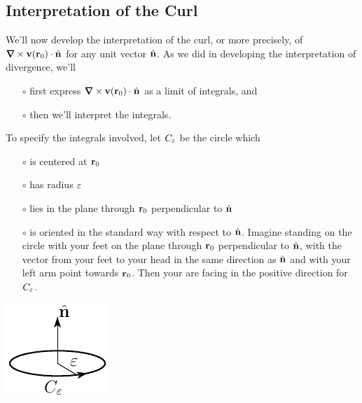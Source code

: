 \subsection{Interpretation of the Curl}\label{sec:curlInterp}

We'll now develop the interpretation of the curl, or
more precisely, of $\vnabla\times\vv(\vr_0)\cdot\hn$ for any unit vector $\hat{\mathbf{n}}$.
As we did in developing the interpretation of divergence, we'll
\begin{itemize}\itemsep1pt \parskip0pt  %
\item[$\circ$]
first express $\vnabla\times\vv(\vr_0)\cdot\hn$ as a limit of integrals, and
\item[$\circ$] 
then we'll interpret the integrals.
\end{itemize}
To specify the integrals involved, let $C_\varepsilon$ be the circle which 
\begin{itemize}\itemsep1pt \parskip0pt  %
\item[$\circ$] is centered at $\mathbf{r}_0$
\item[$\circ$] has radius $\varepsilon$
\item[$\circ$] lies in the plane through $\mathbf{r}_0$ perpendicular to $\hat{\mathbf{n}}$
\item[$\circ$] is oriented in the standard way with respect to $\hat{\mathbf{n}}$.
   Imagine standing on the circle with your feet on the plane through $\mathbf{r}_0$ 
   perpendicular to $\hat{\mathbf{n}}$, with the vector from your feet to your head in the
   same direction as  $\hat{\mathbf{n}}$ and with your left arm point towards $\mathbf{r}_0$.
   Then your are facing in the positive direction for $C_\varepsilon$.
\end{itemize}
\begin{nfig}
\begin{center}
    \includegraphics{prepaddle.pdf}
\end{center}
\end{nfig}
